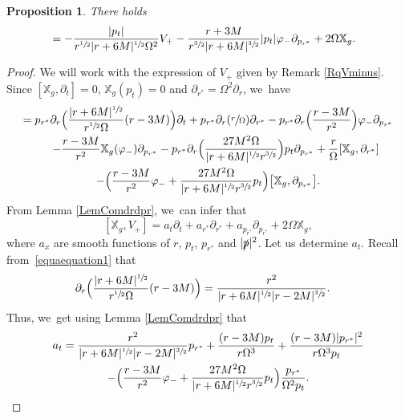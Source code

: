 \documentclass[10pt]{amsart}
\theoremstyle{plain}
\newtheorem{proposition}{Proposition}[section]
\theoremstyle{definition}
\newcommand\T{{\mathbb{X}}}
\begin{document}
\begin{proposition}\label{ProComVminus}
There holds
\begin{align*}
[\T_g,V_+] &= - \frac{|p_t|}{r^{\sfrac{1}{2}}|r+6M|^{\sfrac{1}{2}}\Omega^2} V_+- \frac{r+3M}{r^{\sfrac{3}{2}}|r+6M|^{\sfrac{3}{2}}}|p_t|\varphi_- \partial_{p_{r^*}} + 2\Omega \T_g.
\end{align*}
\end{proposition}

\begin{proof}
We will work with the expression of $V_+$ given by Remark \ref{RqVminus}. Since $[\T_g,\partial_t]=0$, $\T_g(p_t)=0$ and $\partial_{r^*}=\Omega^2 \partial_r$, we~have\vspace*{-5pt}
\begin{multline*}
[\T_g,V_+] = p_{r^*}\partial_{r} \Bigl(\frac{|r+6M|^{\sfrac{1}{2}}}{r^{\sfrac{1}{2}}\Omega}(r-3M) \Bigr) \partial_t+ p_{r^*}\partial_{r}(\sfrac{r}{\Omega}) \partial_{r^*} -p_{r^*} \partial_r \Bigl(\frac{r-3M}{r^2} \Bigr) \varphi_- \partial_{p_{r^*}} \\
\shoveright{- \frac{r-3M}{r^2} \T_g (\varphi_-) \partial_{p_{r^*}} -p_{r^*} \partial_r \Bigl(\frac{27M^2 \Omega}{|r+6M|^{\sfrac{1}{2}}r^{\sfrac{3}{2}}} \Bigr) p_t \partial_{p_{r^*}}+\frac{r}{\Omega}[\T_g, \partial_{r^*}]}\phantom{.}\\
-\Bigl(\frac{r-3M}{r^2} \varphi_- +\frac{27M^2 \Omega}{|r+6M|^{\sfrac{1}{2}}r^{\sfrac{3}{2}}}p_t \Bigr) \bigl[ \T_g, \partial_{p_{r^*}} \bigr].
\end{multline*}
From Lemma \ref{LemComdrdpr}, we~can infer that\vspace*{-3pt}
\[
[\T_g,V_+]= a_t \partial_t+a_{r^*} \partial_{r^*}+a_{p_{r^*}} \partial_{p_{r^*}}+ 2 \Omega \T_g,
\]
where $a_x$ are smooth functions of $r$, $p_t$, $p_{r^*}$ and $|\slashed{p}|^2$. Let us determine $a_{t}$. Recall from~\eqref{equaequation1} that\vspace*{-3pt}
\begin{align*}
\partial_r \Bigl(\frac{|r+6M|^{\sfrac{1}{2}}}{r^{\sfrac{1}{2}} \Omega} (r-3M) \Bigr) &= \frac{r^2}{|r+6M|^{\sfrac{1}{2}} |r-2M|^{\sfrac{3}{2}}}.
\end{align*}
Thus, we~get using Lemma \ref{LemComdrdpr} that\vspace*{-5pt}
\begin{multline*}
a_{t} = \frac{r^2}{|r+6M|^{\sfrac{1}{2}} |r-2M|^{\sfrac{3}{2}}}p_{r^*}+\frac{(r-3M)p_t}{r \Omega^3}+\frac{(r-3M)|p_{r^*}|^2}{r \Omega^3 p_t} \\
-\Bigl(\frac{r-3M}{r^2} \varphi_- +\frac{27M^2 \Omega}{|r+6M|^{\sfrac{1}{2}}r^{\sfrac{3}{2}}}p_t \Bigr) \frac{p_{r^*}}{ \Omega^2p_t}.

\end{multline*}
\end{proof}
\end{document}
